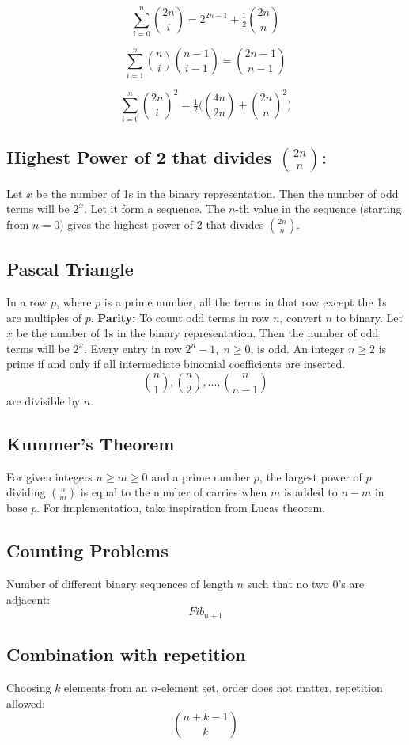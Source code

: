 \[
\sum_{i=0}^n \binom{2n}{i} = 2^{2n-1} + \tfrac{1}{2}\binom{2n}{n}
\]

\[
\sum_{i=1}^n \binom{n}{i}\binom{n-1}{i-1} = \binom{2n-1}{n-1}
\]

\[
\sum_{i=0}^n \binom{2n}{i}^2 = \tfrac{1}{2}\Big( \binom{4n}{2n} + \binom{2n}{n}^2 \Big)
\]


\subsection{Highest Power of 2 that divides $\binom{2n}{n}$:}  
Let $x$ be the number of 1s in the binary representation. Then the number of odd terms will be $2^x$. Let it form a sequence. The $n$-th value in the sequence (starting from $n=0$) gives the highest power of 2 that divides $\binom{2n}{n}$.


\subsection*{Pascal Triangle}
In a row $p$, where $p$ is a prime number, all the terms in that row except the 1s are multiples of $p$. \textbf{Parity:} To count odd terms in row $n$, convert $n$ to binary. Let $x$ be the number of 1s in the binary representation. Then the number of odd terms will be $2^x$. Every entry in row $2^n-1, \; n\geq0$, is odd.
An integer $n\geq 2$ is prime if and only if all intermediate binomial coefficients are inserted.
\[
\binom{n}{1}, \binom{n}{2}, \dots, \binom{n}{n-1}
\] are divisible by $n$.

\subsection{Kummer’s Theorem} 
For given integers $n \geq m \geq 0$ and a prime number $p$, the largest power of $p$ dividing $\binom{n}{m}$ is equal to the number of carries when $m$ is added to $n-m$ in base $p$. For implementation, take inspiration from Lucas theorem.

\subsection{Counting Problems}
Number of different binary sequences of length $n$ such that no two 0’s are adjacent:
\[
Fib_{n+1}
\]

\subsection{Combination with repetition}
Choosing $k$ elements from an $n$-element set, order does not matter, repetition allowed:
\[
\binom{n+k-1}{k}
\]



